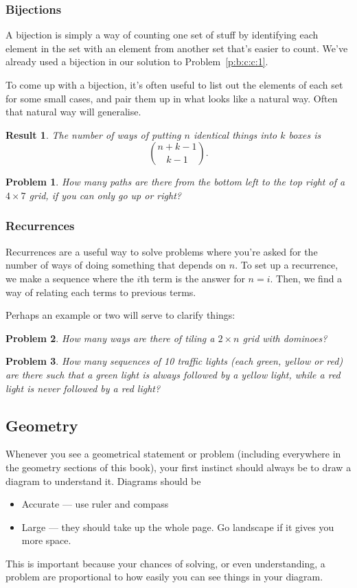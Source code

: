 \documentclass{amsart}
\newtheorem{problem}{Problem}[subsubsection]
\newtheorem{result}{Result}[subsubsection]
\begin{document}
\subsubsection{Bijections}
A bijection is simply a way of counting one set of stuff by identifying each
element in the set with an element from another set that's easier to count.
We've already used a bijection in our solution to Problem~\ref{p:b:c:c:1}.

To come up with a bijection, it's often useful to list out the elements of each
set for some small cases, and pair them up in what looks like a natural way.
Often that natural way will generalise.

\begin{result}{\label{r:b:c:b:1}}
  The number of ways of putting $n$ identical things into $k$ boxes is
  \[\binom{n+k-1}{k-1}.\]
\end{result}
\begin{problem}{\label{p:b:c:b:1}}
  How many paths are there from the bottom left to the top right of a $4\times
  7$ grid, if you can only go up or right?
\end{problem}
\subsubsection{Recurrences}
Recurrences are a useful way to solve problems where you're asked for the number
of ways of doing something that depends on $n$. To set up a recurrence, we make
a sequence where the $i$th term is the answer for $n=i$. Then, we find a way of
relating each terms to previous terms.

Perhaps an example or two will serve to clarify things:
\begin{problem}{\label{p:b:c:r:1}}
  How many ways are there of tiling a $2\times n$ grid with dominoes?
\end{problem}
\begin{problem}{\label{p:b:c:r:2}}
  How many sequences of 10 traffic lights (each green, yellow or red) are there
  such that a green light is always followed by a yellow light, while a red light
  is never followed by a red light?
\end{problem}
\subsection{Geometry}
Whenever you see a geometrical statement or problem (including everywhere in the
geometry sections of this book), your first instinct should
always be to draw a diagram to understand it. Diagrams should be
\begin{itemize}
  \item Accurate --- use ruler and compass
  \item Large --- they should take up the whole page. Go landscape if it gives
    you more space.
\end{itemize}
This is important because your chances of solving, or even understanding, a
problem are proportional to how easily you can see things in your diagram.
\end{document}
